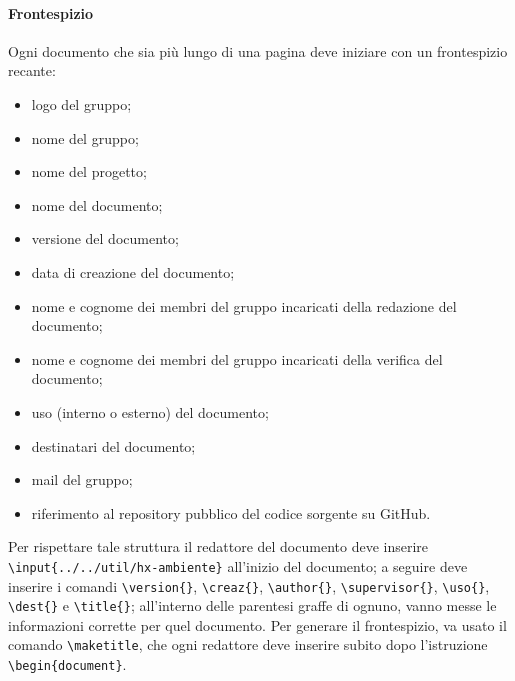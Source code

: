 \paragraph{Frontespizio} Ogni documento che sia più lungo di una pagina deve iniziare con un frontespizio recante:
\begin{itemize}
	\item logo del gruppo;
	\item nome del gruppo;
	\item nome del progetto;
	\item nome del documento;
	\item versione del documento;
	\item data di creazione del documento;
	\item nome e cognome dei membri del gruppo incaricati della redazione del documento;
	\item nome e cognome dei membri del gruppo incaricati della verifica del documento;
	\item uso (interno o esterno) del documento;
	\item destinatari del documento;
	\item mail del gruppo;
	\item riferimento al repository pubblico del codice sorgente su GitHub.
\end{itemize} 
Per rispettare tale struttura il redattore del documento deve inserire \\\texttt{\textbackslash input\{../../util/hx-ambiente\}} all'inizio del documento; a seguire deve inserire i comandi \texttt{\textbackslash version\{\}}, \texttt{\textbackslash creaz\{\}}, \texttt{\textbackslash author\{\}}, \texttt{\textbackslash supervisor\{\}}, \texttt{\textbackslash uso\{\}}, \texttt{\textbackslash dest\{\}} e \texttt{\textbackslash title\{\}}; all'interno delle parentesi graffe di ognuno, vanno messe le informazioni corrette per quel documento. Per generare il frontespizio, va usato il comando \texttt{\textbackslash maketitle}, che ogni redattore deve inserire subito dopo l'istruzione \texttt{\textbackslash begin\{document\}}.
